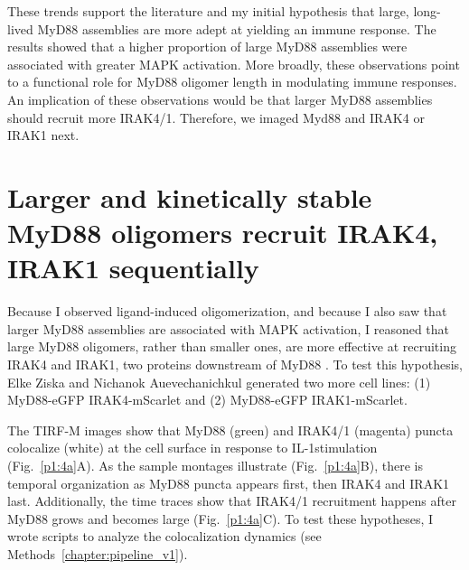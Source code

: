 These trends support the literature \autocite{Latty_2018} and my initial hypothesis that large, long-lived MyD88 assemblies are more adept at yielding an immune response. The results showed that a higher proportion of large MyD88 assemblies were associated with greater MAPK activation. More broadly, these observations point to a functional role for MyD88 oligomer length in modulating immune responses. An implication of these observations would be that larger MyD88 assemblies should recruit more IRAK4/1. Therefore, we imaged Myd88 and IRAK4 or IRAK1 next.

\section{Larger and kinetically stable MyD88 oligomers recruit IRAK4, IRAK1 sequentially}
\label{section:IRAK_recruitment}
Because I observed ligand-induced oligomerization, and because I also saw that larger MyD88 assemblies are associated with MAPK activation, I reasoned that large MyD88 oligomers, rather than smaller ones, are more effective at recruiting IRAK4 and IRAK1, two proteins downstream of MyD88 \autocite{Lin_2010}. To test this hypothesis, Elke Ziska and Nichanok Auevechanichkul generated two more cell lines: (1) MyD88-eGFP IRAK4-mScarlet and (2) MyD88-eGFP IRAK1-mScarlet.

The TIRF-M images show that MyD88 (green) and IRAK4/1 (magenta) puncta colocalize (white) at the cell surface in response to IL-1\textbeta stimulation (Fig.~\ref{p1:4a}A). As the sample montages illustrate (Fig.~\ref{p1:4a}B), there is temporal organization as MyD88 puncta appears first, then IRAK4 and IRAK1 last. Additionally, the time traces show that IRAK4/1 recruitment happens after MyD88 grows and becomes large (Fig.~\ref{p1:4a}C). To test these hypotheses, I wrote scripts to analyze the colocalization dynamics (see Methods~\ref{chapter:pipeline_v1}).



